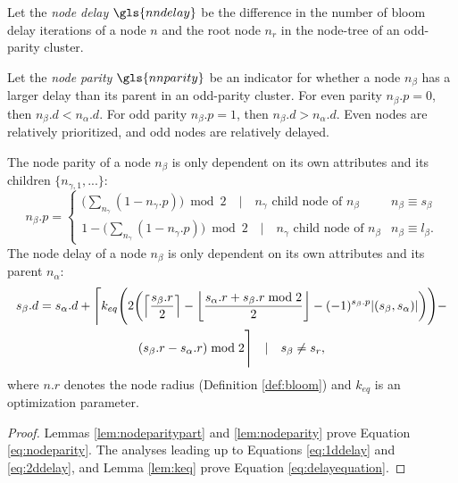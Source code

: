 \begin{definition}\label{def:nodedelay}
  Let the \emph{node delay} $\gls{nndelay}$ be the difference in the number of bloom delay iterations of a node $n$ and the root node $n_r$ in the node-tree of an odd-parity cluster.
\end{definition}

\begin{definition}\label{def:nodeparity}
  Let the \emph{node parity} $\gls{nnparity}$ be an indicator for whether a node $n_\beta$ has a larger delay than its parent in an odd-parity cluster. For even parity $n_\beta.p=0$, then $n_\beta.d < n_\alpha.d$. For odd parity $n_\beta.p=1$, then $n_\beta.d > n_\alpha.d$. Even nodes are relatively prioritized, and odd nodes are relatively delayed.
\end{definition}

\begin{theorem}\label{the:delayequation}
  The node parity of a node $n_\beta$ is only dependent on its own attributes and its children $\{n_{\gamma,1}, ...\}$:
  \begin{equation}\label{eq:nodeparity}
    n_\beta.p =
    \begin{cases}
      \big( \sum_{n_\gamma} (1-n_\gamma.p) \big ) \bmod 2 \hspace{1em} | \hspace{1em} n_\gamma \text{ child node of } n_\beta & n_\beta \equiv s_\beta \\
      1 - \big( \sum_{n_\gamma} (1-n_\gamma.p) \big ) \bmod 2 \hspace{1em} | \hspace{1em} n_\gamma \text{ child node of } n_\beta & n_\beta \equiv l_\beta.
    \end{cases} 
  \end{equation}
  The node delay of a node $n_\beta$ is only dependent on its own attributes and its parent $n_\alpha$:
  \begin{multline}\label{eq:delayequation}
    s_\beta.d = s_\alpha.d + \Bigg \lceil k_{eq} \Bigg( 2\bigg({\left \lceil \frac{s_\beta.r}{2} \right \rceil } - {\left \lfloor \frac{s_\alpha.r + s_\beta.r \bmod 2}{2} \right \rfloor } - (-1)^{s_\beta.p}\abs{(s_\beta,s_\alpha)}\bigg)
    \Bigg) - \\
    (s_\beta.r - s_\alpha.r) \bmod 2 \Bigg \rceil \hspace{1em} | \hspace{1em} s_\beta \neq s_r,
  \end{multline}
  where $n.r$ denotes the node radius (Definition \ref{def:bloom}) and $k_{eq}$ is an optimization parameter.
\end{theorem}
\begin{proof}
  Lemmas \ref{lem:nodeparitypart} and \ref{lem:nodeparity} prove Equation \ref{eq:nodeparity}. The analyses leading up to Equations \eqref{eq:1ddelay} and \eqref{eq:2ddelay}, and Lemma \ref{lem:keq} prove Equation \eqref{eq:delayequation}.
\end{proof}

